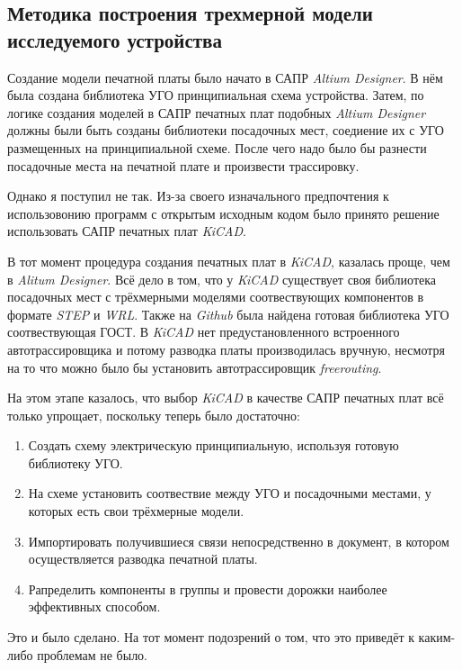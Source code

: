 \subsection{Методика построения трехмерной модели исследуемого устройства}

Создание модели печатной платы было начато в САПР \textit{Altium Designer}.
В нём была создана библиотека УГО принципиальная схема устройства.
Затем, по логике создания моделей в САПР печатных плат подобных \textit{Altium Designer} должны были быть созданы библиотеки посадочных мест, соедиение их с УГО размещенных на принципиальной схеме.
После чего надо было бы разнести посадочные места на печатной плате и произвести трассировку.

Однако я поступил не так.
Из-за своего изначального предпочтения к использовонию программ с открытым исходным кодом было принято решение использовать САПР печатных плат \textit{KiCAD}.

В тот момент процедура создания печатных плат в \textit{KiCAD}, казалась проще, чем в \textit{Alitum Designer}. Всё дело в том, что у \textit{KiCAD} существует своя библиотека посадочных мест с трёхмерными моделями соотвествующих компонентов в формате \textit{STEP} и \textit{WRL}. Также на \textit{Github} была найдена готовая библиотека УГО соотвествующая ГОСТ.
В \textit{KiCAD} нет предустановленного встроенного автотрассировщика и потому разводка платы производилась вручную,
несмотря на то что можно было бы установить автотрассировщик \textit{freerouting}.

На этом этапе казалось, что выбор \textit{KiCAD} в качестве САПР печатных плат всё только упрощает, поскольку теперь было достаточно:
\begin{enumerate}[label={\arabic*.}]
\item Создать схему электрическую принципиальную, используя готовую библиотеку УГО.
\item На схеме установить соотвествие между УГО и посадочными местами, у которых есть свои трёхмерные модели.
\item Импортировать получившиеся связи непосредственно в документ, в котором осуществляется разводка печатной платы.
\item Рапределить компоненты в группы и провести дорожки наиболее эффективных способом.
\end{enumerate}

Это и было сделано. На тот момент подозрений о том, что это приведёт к каким-либо проблемам не было.

